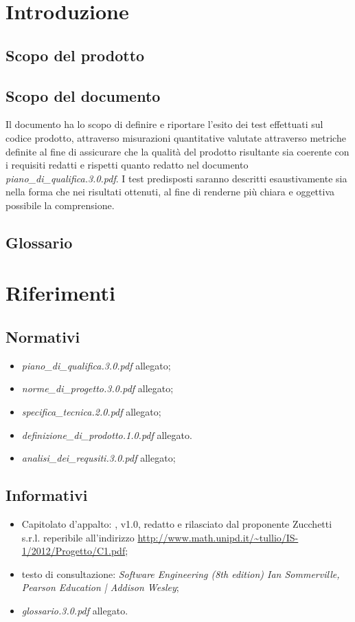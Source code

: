 \newpage

\section{Introduzione}
\subsection{Scopo del prodotto}
\purpose

\subsection{Scopo del documento}
Il documento ha lo scopo di definire e riportare l'esito dei test effettuati sul codice prodotto, attraverso misurazioni quantitative valutate attraverso metriche definite al fine di assicurare che la qualità del prodotto risultante sia coerente con i requisiti redatti e rispetti quanto redatto nel documento \textit{piano\_di\_qualifica.3.0.pdf}.
I test predisposti saranno descritti esaustivamente sia nella forma che nei risultati ottenuti, al fine di renderne più chiara e oggettiva possibile la comprensione.

\subsection{Glossario}
\glossaryIntro
\clearpage

\section{Riferimenti}
\subsection{Normativi}
\begin{itemize}
\item[] \textit{piano\_di\_qualifica.3.0.pdf} allegato;
\item[] \textit{norme\_di\_progetto.3.0.pdf} allegato;
\item[] \textit{specifica\_tecnica.2.0.pdf} allegato;
\item[] \textit{definizione\_di\_prodotto.1.0.pdf} allegato.
\item[] \textit{analisi\_dei\_requsiti.3.0.pdf} allegato;
\end{itemize}

\subsection{Informativi}
\begin{itemize}
\item[] Capitolato d'appalto: \caName{}, v1.0, redatto e rilasciato dal proponente Zucchetti s.r.l. reperibile all'indirizzo \url{http://www.math.unipd.it/~tullio/IS-1/2012/Progetto/C1.pdf};
\item[] testo di consultazione: \textit{Software Engineering (8th edition) Ian Sommerville, Pearson Education | Addison Wesley};
\item[] \textit{glossario.3.0.pdf} allegato.
\end{itemize}
\clearpage

